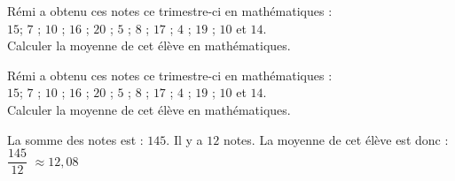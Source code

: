 \begin{exercice*}[Notes]
    Rémi a obtenu ces notes ce trimestre-ci en mathématiques :\\
    $15$; $7$ ; $10$ ; $16$ ; $20$ ; $5$ ; $8$ ; $17$ ; $4$ ; $19$ ; $10$ et $14$.\\
    Calculer la moyenne de cet élève en mathématiques.

\end{exercice*}
\begin{corrige}
        Rémi a obtenu ces notes ce trimestre-ci en mathématiques :\\
    $15$; $7$ ; $10$ ; $16$ ; $20$ ; $5$ ; $8$ ; $17$ ; $4$ ; $19$ ; $10$ et $14$.\\
    Calculer la moyenne de cet élève en mathématiques.
    
    {\red
        La somme des notes est : $145$.
         Il y a $12$ notes.
        La moyenne de cet élève est donc : $\dfrac{145}{12}$ $\approx12{,}08$
    }
\end{corrige}

